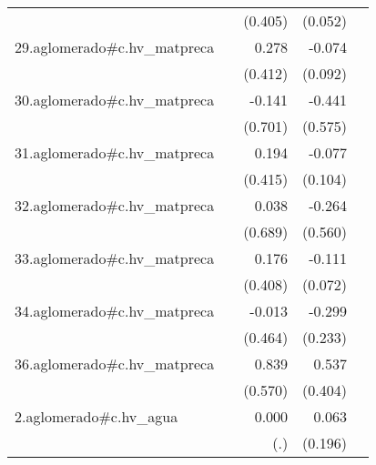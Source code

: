 {\begin{longtable}{l*{4}{D{.}{.}{-1}}}
            &                     &     (0.405)         &     (0.052)         &                     \\
\addlinespace
29.aglomerado#c.hv\_matpreca&                     &       0.278         &      -0.074         &                     \\
            &                     &     (0.412)         &     (0.092)         &                     \\
\addlinespace
30.aglomerado#c.hv\_matpreca&                     &      -0.141         &      -0.441         &                     \\
            &                     &     (0.701)         &     (0.575)         &                     \\
\addlinespace
31.aglomerado#c.hv\_matpreca&                     &       0.194         &      -0.077         &                     \\
            &                     &     (0.415)         &     (0.104)         &                     \\
\addlinespace
32.aglomerado#c.hv\_matpreca&                     &       0.038         &      -0.264         &                     \\
            &                     &     (0.689)         &     (0.560)         &                     \\
\addlinespace
33.aglomerado#c.hv\_matpreca&                     &       0.176         &      -0.111         &                     \\
            &                     &     (0.408)         &     (0.072)         &                     \\
\addlinespace
34.aglomerado#c.hv\_matpreca&                     &      -0.013         &      -0.299         &                     \\
            &                     &     (0.464)         &     (0.233)         &                     \\
\addlinespace
36.aglomerado#c.hv\_matpreca&                     &       0.839         &       0.537         &                     \\
            &                     &     (0.570)         &     (0.404)         &                     \\
\addlinespace
2.aglomerado#c.hv\_agua&                     &       0.000         &       0.063         &                     \\
            &                     &         (.)         &     (0.196)         &                     \\

\end{longtable}}
